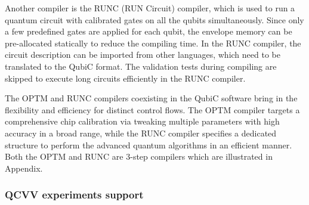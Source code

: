 \documentclass{ieeetran}
\begin{document}
Another compiler is the RUNC (RUN Circuit) compiler, which is used to run a quantum circuit with calibrated gates on all the qubits simultaneously.
Since only a few predefined gates are applied for each qubit, the envelope memory can be pre-allocated statically to reduce the compiling time. 
In the RUNC compiler, the circuit description can be imported from other languages, which need to be translated to the QubiC format. 
The validation tests during compiling are skipped to execute long circuits efficiently in the RUNC compiler.


The OPTM and RUNC compilers coexisting in the QubiC software bring in the flexibility and efficiency for distinct control flows. 
The OPTM compiler targets a comprehensive chip calibration via tweaking multiple parameters with high accuracy in a broad range, while the RUNC compiler specifies a dedicated structure to perform the advanced quantum algorithms in an efficient manner.
Both the OPTM and RUNC are 3-step compilers which are illustrated in Appendix.

\subsubsection{QCVV experiments support}
\end{document}
